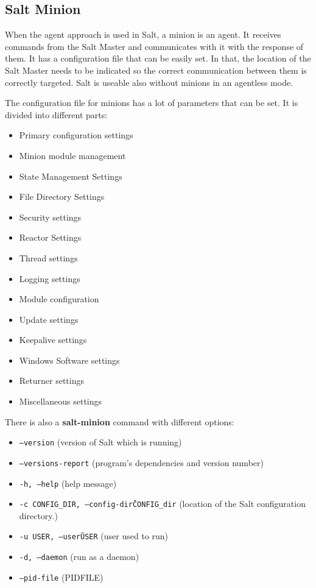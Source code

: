 \documentclass[12pt,a4paper,openright,twoside]{book}
\begin{document}

\subsection{Salt Minion}
When the agent approach is used in Salt, a minion is an agent. It receives commands from the Salt Master and communicates with it with the response of them. It has a configuration file that can be easily set. In that, the location of the Salt Master needs to be indicated so the correct communication between them is correctly targeted.
Salt is useable also without minions in an agentless mode.


The configuration file for minions has a lot of parameters that can be set.
It is divided into different parts:
\begin{itemize}
    \item Primary configuration settings
    \item Minion module management
    \item State Management Settings
    \item File Directory Settings
    \item Security settings
    \item Reactor Settings
    \item Thread settings
    \item Logging settings
    \item Module configuration
    \item Update settings
    \item Keepalive settings
    \item Windows Software settings
    \item Returner settings
    \item Miscellaneous settings
\end{itemize}

There is also a \textbf{salt-minion} command with different options:

\begin{itemize}
    \item \texttt{--version} (version of Salt which is running)
    \item \texttt{--versions-report} (program's dependencies and version number)
    \item \texttt{-h, --help} (help message)
    \item \texttt{-c CONFIG\_DIR, --config-dir\=CONFIG\_dir} (location of the Salt configuration directory.)
    \item \texttt{-u USER, --user\=USER} (user used to run)
    \item \texttt{-d, --daemon} (run as a daemon)
    \item \texttt{--pid-file} (PIDFILE)
\end{itemize}
\end{document}
